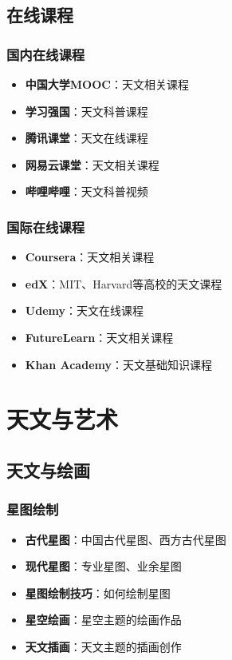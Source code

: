 \documentclass[12pt,UTF8]{ctexbook}
\begin{document}
\chapter{在线课程}
\section{国内在线课程}

\begin{itemize}
  \item \textbf{中国大学MOOC}：天文相关课程
  \item \textbf{学习强国}：天文科普课程
  \item \textbf{腾讯课堂}：天文在线课程
  \item \textbf{网易云课堂}：天文相关课程
  \item \textbf{哔哩哔哩}：天文科普视频
\end{itemize}

\section{国际在线课程}

\begin{itemize}
  \item \textbf{Coursera}：天文相关课程
  \item \textbf{edX}：MIT、Harvard等高校的天文课程
  \item \textbf{Udemy}：天文在线课程
  \item \textbf{FutureLearn}：天文相关课程
  \item \textbf{Khan Academy}：天文基础知识课程
\end{itemize}

\part{天文与艺术}

\chapter{天文与绘画}
\section{星图绘制}

\begin{itemize}
  \item \textbf{古代星图}：中国古代星图、西方古代星图
  \item \textbf{现代星图}：专业星图、业余星图
  \item \textbf{星图绘制技巧}：如何绘制星图
  \item \textbf{星空绘画}：星空主题的绘画作品
  \item \textbf{天文插画}：天文主题的插画创作
\end{itemize}
\end{document}
